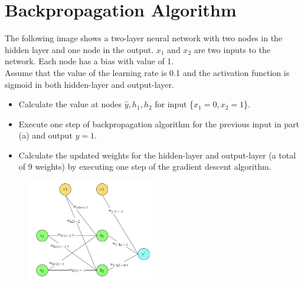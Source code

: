 \documentclass[12pt]{article}
\begin{document}
\section{Backpropagation Algorithm}
The following image shows a two-layer neural network with two nodes in the hidden layer and one node in the output. $x_1$ and $x_2$ are two inputs to the network. Each node has a bias with value of 1.
\\
Assume that the value of the learning rate is 0.1 and the activation function is sigmoid in both hidden-layer and output-layer.
\begin{itemize}
    \item Calculate the value at nodes $\hat{y} , h_1 , h_2$ for input \{$x_1 = 0 , x_2 = 1$\}.
    \item Execute one step of backpropagation algorithm for the previous input in part (a) and output $y = 1$.
    \item Calculate the updated weights for the hidden-layer and output-layer (a total of 9 weights) by executing one step of the gradient descent algorithm.
\end{itemize}
\begin{figure}[h]
    \centering
    \includegraphics[width=0.5\textwidth]{Q4.png}
\end{figure}
\end{document}
